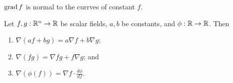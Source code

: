 
\begin{remark}
    $\operatorname{grad} f$ is normal to the currves of constant $f$.
\end{remark}

\begin{proposition}
    Let $f, g: \mathbb{R}^n \to \mathbb{R}$ be scalar fields, $a, b$ be constants, and $\phi: \mathbb{R} \to \mathbb{R}$. Then
    \begin{enumerate}
        \item $\nabla(af + bg) = a\nabla f + b\nabla g$;
        \item $\nabla(fg) = \nabla f g + f \nabla g$; and
        \item $\nabla(\phi(f)) = \nabla f \cdot \frac{d\phi}{df}$.
    \end{enumerate}
\end{proposition}

